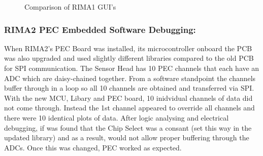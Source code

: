 \begin{figure}[htbp]
    \centering
    \hspace{0.5cm}
    \caption{Comparison of RIMA1 GUI's}
    \label{fig:r1gui}
\end{figure}
\newpage
{}

\subsubsection{RIMA2 PEC Embedded Software Debugging: }

When RIMA2's PEC Board was installed, its microcontroller onboard the PCB was also upgraded and used slightly different libraries compared to the old PCB for SPI communication. The Sensor Head has 10 PEC
channels that each have an ADC which are daisy-chained together. From a software standpoint the channels buffer through in a loop so all 10 channels are obtained and transferred via SPI. With the new MCU, Libary and PEC board,
10 inidvidual channels of data did not come through. Instead the 1st channel appeared to override all channels and there were 10 identical plots of data. After logic analysing and electrical debugging, if was found that 
the Chip Select was a consant (set this way in the updated library) and as a result, would not allow proper buffering through the ADCs. Once this was changed, PEC worked as expected.

